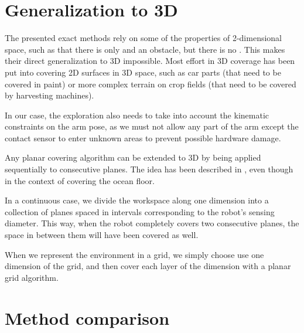\documentclass[buriama8_dp.tex]{subfiles}
\begin{document}
\section{Generalization to 3D}

The presented exact methods rely on some of the properties of 2-dimensional space, such as that there is only  and  an obstacle, but there is no . This makes their direct generalization to 3D impossible. Most effort in 3D coverage has been put into covering 2D surfaces in 3D space, such as car parts (that need to be covered in paint) or more complex terrain on crop fields (that need to be covered by harvesting machines). %

In our case, the exploration also needs to take into account the kinematic constraints on the arm pose, as we must not allow any part of the arm except the contact sensor to enter unknown areas to prevent possible hardware damage.

Any planar covering algorithm can be extended to 3D by being applied sequentially to consecutive planes. The idea has been described in \cite{gen3d}, even though in the context of covering the ocean floor.

In a continuous case, we divide the workspace along one dimension into a collection of planes spaced in intervals corresponding to the robot's sensing diameter. This way, when the robot completely covers two consecutive planes, the space in between them will have been covered as well.

When we represent the environment in a grid, we simply choose use one dimension of the grid, and then cover each layer of the dimension with a planar grid algorithm.

\section{Method comparison}
\end{document}
